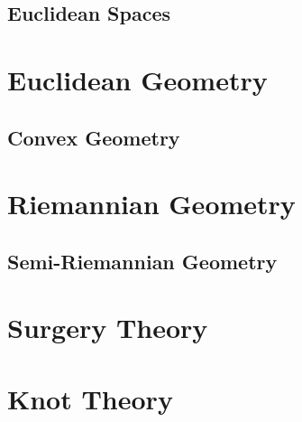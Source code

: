 \documentclass{book}                                                           %
\begin{document}
                \chapter{Euclidean Spaces}
                    \renewcommand{\PATH}{\PARPATH/Euclidean_Spaces}
                    \label{chapt:Euclidean_Spaces}%
                    
            \part{Euclidean Geometry}
                \renewcommand{\PARPATH}{\TOPPATH/Geometry/Euclidean_Geometry}
                \chapter{Convex Geometry}
                    \renewcommand{\PATH}{\PARPATH/Convex_Geometry}
                    \label{chapt:Euclidean_Spaces}%
                    
            \part{Riemannian Geometry}
                \renewcommand{\PARPATH}{\TOPPATH/Geometry/Riemannian_Geometry}
                \chapter{Semi-Riemannian Geometry}
                    \renewcommand{\PATH}{\PARPATH/Semi_Riemannian_Geometry}
                    \label{chapt:Semi_Riemannian}%
                    
        \clearpage
        \setcounter{endpage}{\thepage}
    \fi

            \label{book:Geometric_Topology}%
            \renewcommand{\PATH}{\TOPPATH/Geometric_Topology}
            \setcounter{page}{\value{endpage}}
            \part{Surgery Theory}
                
            \part{Knot Theory}
                
        \clearpage
        \setcounter{endpage}{\thepage}
    \fi
\end{document}
